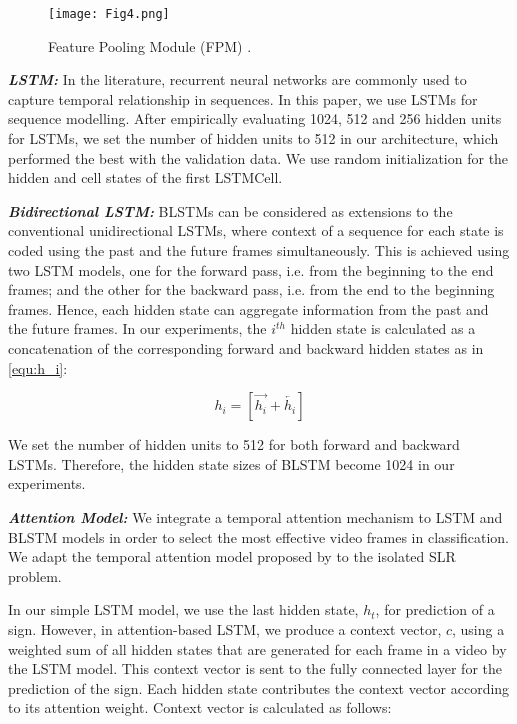 \documentclass[11pt, a4paper, singlecolumn]{article}
\begin{document}
\begin{figure}
	\centering
	\texttt{[image: Fig4.png]}
	\caption{Feature Pooling Module (FPM) \cite{sincan2019isolated}.}
	\label{fig4}
\end{figure}

\textit{\textbf{LSTM: }} In the literature, recurrent neural networks are commonly used to capture temporal relationship in sequences. In this paper, we use LSTMs \cite{hochreiter1997long} for sequence modelling. After empirically evaluating 1024, 512 and 256 hidden units for LSTMs, we set the number of hidden units to 512 in our architecture, which performed the best with the validation data.  We use random initialization for the hidden and cell states of the first LSTMCell.

\textit{\textbf{Bidirectional LSTM: }} BLSTMs \cite{graves2005framewise} can be considered as extensions to the conventional unidirectional LSTMs, where context of a sequence for each state is coded using the past and the future frames simultaneously. This is achieved using two LSTM models, one for the forward pass, i.e. from the beginning to the end frames; and the other for the backward pass, i.e. from the end to the beginning frames. Hence, each hidden state can aggregate information from the past and the future frames. In our experiments, the $i^{th}$ hidden state is calculated as a concatenation of the corresponding forward and backward hidden states as in \eqref{equ:h_i}:

\begin{equation}
\label{equ:h_i}
h_i= [\overrightarrow{h_i} + \overleftarrow{h_i}]
\end{equation}

We set the number of hidden units to 512 for both forward and backward LSTMs. Therefore, the hidden state sizes of BLSTM become 1024 in our experiments.

\textit{\textbf{Attention Model: }} We integrate a temporal attention mechanism to LSTM and BLSTM models in order to select the most effective video frames in classification. We adapt the temporal attention model proposed by \cite{bahdanau2014neural, raffel2015feed}  to the isolated SLR problem.

In our simple LSTM model, we use the last hidden state, $h_t$, for prediction of a sign. However, in attention-based LSTM, we produce a context vector, $c$, using a weighted sum of all hidden states that are generated for each frame in a video by the LSTM model. This context vector is sent to the fully connected layer for the prediction of the sign. Each hidden state contributes the context vector according to its attention weight. Context vector is calculated as follows:
\end{document}

